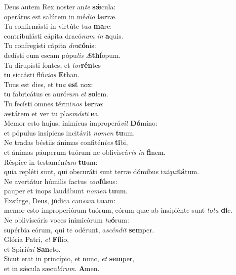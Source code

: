 \oddverse Deus autem Rex noster an\textit{te} \textbf{sǽ}cula:~\*\\
\oddverse operátus est salútem in mé\textit{di}\textit{o} \textbf{ter}ræ.\\
\evenverse Tu confirmásti in virtúte tu\textit{a} \textbf{ma}re:~\*\\
\evenverse contribulásti cápita dracó\textit{num} \textit{in} \textbf{a}quis.\\
\oddverse Tu confregísti cápita \textit{dra}\textbf{có}nis:~\*\\
\oddverse dedísti eum escam pópu\textit{lis} \textit{Æ}\textbf{thí}opum.\\
\evenverse Tu dirupísti fontes, et \textit{tor}\textbf{rén}tes~\*\\
\evenverse tu siccásti flú\textit{vi}\textit{os} \textbf{E}than.\\
\oddverse Tuus est dies, et tu\textit{a} \textbf{est} nox:~\*\\
\oddverse tu fabricátus es auró\textit{ram} \textit{et} \textbf{so}lem.\\
\evenverse Tu fecísti omnes térmi\textit{nos} \textbf{ter}ræ:~\*\\
\evenverse æstátem et ver tu plas\textit{má}\textit{sti} \textbf{e}a.\\
\oddverse Memor esto hujus, inimícus improperá\textit{vit} \textbf{Dó}mino:~\*\\
\oddverse et pópulus insípiens incitávit \textit{no}\textit{men} \textbf{tu}um.\\
\evenverse Ne tradas béstiis ánimas confitén\textit{tes} \textbf{ti}bi,~\*\\
\evenverse et ánimas páuperum tuórum ne obliviscá\textit{ris} \textit{in} \textbf{fi}nem.\\
\oddverse Réspice in testamén\textit{tum} \textbf{tu}um:~\*\\
\oddverse quia repléti sunt, qui obscuráti sunt terræ dómibus i\textit{ni}\textit{qui}\textbf{tá}tum.\\
\evenverse Ne avertátur húmilis factus \textit{con}\textbf{fú}sus:~\*\\
\evenverse pauper et inops laudábunt \textit{no}\textit{men} \textbf{tu}um.\\
\oddverse Exsúrge, Deus, júdica cau\textit{sam} \textbf{tu}am:~\*\\
\oddverse memor esto improperiórum tuórum, eórum quæ ab insipiénte sunt \textit{to}\textit{ta} \textbf{di}e.\\
\evenverse Ne obliviscáris voces inimicórum \textit{tu}\textbf{ó}rum:~\*\\
\evenverse supérbia eórum, qui te odérunt, a\textit{scén}\textit{dit} \textbf{sem}per.\\
\oddverse Glória Patri, \textit{et} \textbf{Fí}lio,~\*\\
\oddverse et Spirí\textit{tu}\textit{i} \textbf{San}cto.\\
\evenverse Sicut erat in princípio, et nunc, \textit{et} \textbf{sem}per,~\*\\
\evenverse et in sǽcula sæcu\textit{ló}\textit{rum}. \textbf{A}men.\\
